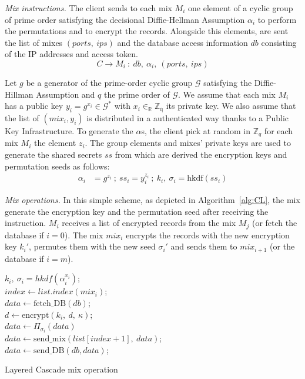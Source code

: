 \documentclass[USenglish,oneside,twocolumn]{article}
\begin{document}
\noindent\textit{Mix instructions.}
The client sends to each mix $M_i$ one element of a cyclic group of prime order satisfying the decisional Diffie-Hellman Assumption $\alpha_i$ to perform the permutations and to encrypt the records. Alongside this elements, are sent the list of mixes $(ports,\ ips)$ and the database access information $db$ consisting of the IP addresses and access token.
$$ C \rightarrow M_i\ :\ db,\ \alpha_{i},\ (ports,\ ips) $$

Let $g$ be a generator of the prime-order cyclic group $\mathcal{G}$ satisfying the Diffie-Hillman Assumption and $q$ the prime order of $\mathcal{G}$. We assume that each mix $M_i$ has a public key $y_i=g^{x_i}\in \mathcal{G}^*$ with $x_i \in_{\mathbb{R}} \mathbb{Z_q}$ its private key. We also assume that the list of $(mix_i, y_i)$ is distributed in a authenticated way thanks to a Public Key Infrastructure.
To generate the $\alpha$s, the client pick at random in $\mathbb{Z}_q$ for each mix $M_i$ the element $z_i$. The group elements and mixes' private keys are used to generate the shared secrets $ss$ from which are derived the encryption keys and permutation seeds as follows:
\begin{align*}
\alpha_i &= g^{z_i}\ ;\ ss_i = y_i^{z_i}\ ;\ k_i,\ \sigma_i=\text{hkdf}(ss_i)
\end{align*}


\noindent\textit{Mix operations.} In this simple scheme, as depicted in Algorithm~\ref{alg:CL}, the mix generate the encryption key and the permutation seed after receiving the instruction. $M_i$ receives a list of encrypted records from the mix $M_j$ (or fetch the database if $i=0$). The mix $mix_i$ encrypts the records with the new encryption key $k_i'$, permutes them with the new seed $\sigma_{i}'$ and sends them to $mix_{i+1}$ (or the database if $i=m$).\\

\begin{algorithm}
\DontPrintSemicolon
{}
$k_i,\ \sigma_{i}=hkdf(\alpha_{i}^{x_i})$;\\
$index \gets list.index(mix_i)$;\\
{
$data \gets \text{fetch\_DB}(db)$;\\
}
{
	$d \gets \text{encrypt}\left(k_i,\ d,\ \kappa\right)$;\\
}
$data \gets \Pi_{\sigma_i}(data)$\\
{
$data \gets \text{send\_mix}(list[index+1],\ data)$;\\
}
\Else
{
$data \gets \text{send\_DB}(db, data)$;\\
}
\caption{Layered Cascade mix operation}
\label{alg:CL}
\end{algorithm}
\end{document}
